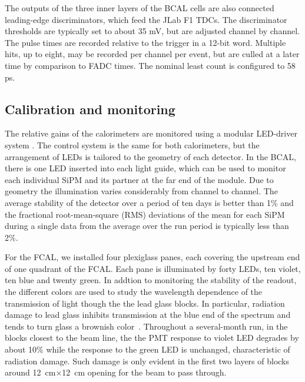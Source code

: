 The outputs of the three inner layers of the BCAL cells are also connected leading-edge discriminators, which feed the JLab F1 TDCs. 
 The discriminator thresholds are typically set to about 35 mV, but are adjusted
 channel by channel.  The pulse times are recorded relative to the trigger in a 12-bit word. Multiple hits, up to eight, may be recorded per channel per event, but are culled at a later time by comparison to FADC times. The nominal least count is configured to 58\,ps.


\subsection[Calibration and monitoring]{Calibration and monitoring \label{sec:calcalib}}
The relative gains of the calorimeters are monitored using a modular LED-driver system \cite{Anassontzis201441}. The control system is the same for both calorimeters, but the arrangement of LEDs is tailored to the geometry of each detector. In the BCAL, there is one LED inserted into each light guide, which can be used to monitor each individual SiPM and its partner at the far end of the module.
Due to geometry the illumination varies considerably from channel to channel. 
The average stability of the detector over a period of ten days is better than 1\% and the fractional root-mean-square (RMS) deviations of the mean for each SiPM during a single data from the average over the run period is typically less than 2\%.

For the FCAL, we installed four plexiglass panes, each covering the upstream end of one quadrant of the FCAL. Each pane is illuminated by forty LEDs, ten violet, ten blue and twenty green. In addtion to monitoring the stability of the readout, the different colors are used to study the wavelength dependence of the transmission of light though the the lead glass blocks.  In particular, radiation damage to lead glass inhibits transmission at the blue end of the spectrum and tends to turn glass a brownish color~\cite{Schaefer:2011gw}.  Throughout a several-month run, in the blocks closest to the beam line, the the PMT response to violet LED degrades by about 10\% while the response to the green LED is unchanged, characteristic of radiation damage.  Such damage is only evident in the first two layers of blocks around 12~cm$\times$12~cm opening for the beam to pass through.


